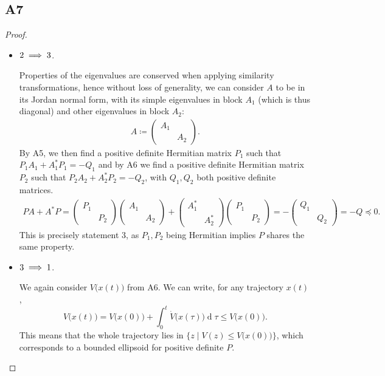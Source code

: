 \documentclass[11pt]{article}
\DeclareMathOperator{\newdiff}{d} %
\newcommand{\dif}{\newdiff\!}
\begin{document}
\subsection*{A7}
\begin{proof}\leavevmode
\begin{itemize}
	\item \(\textnormal{2} \implies \textnormal{3}\).
	
	Properties of the eigenvalues are conserved when applying similarity transformations, hence without loss of generality, we can consider \(A\) to be in its Jordan normal form, with its simple eigenvalues in block $A_1$ (which is thus diagonal) and other eigenvalues in block $A_2$:
	\begin{align*}
	A \coloneqq \begin{pmatrix}
	A_1 & \\
	& A_2
	\end{pmatrix}.
	\end{align*}
	By A5, we then find a positive definite  Hermitian matrix $P_1$ such that $P_1A_1+A_1^*P_1=-Q_1$ and by A6 we find a positive definite Hermitian matrix $P_2$ such that $P_2A_2+A_2^*P_2=-Q_2$, with \(Q_1, Q_2\) both positive definite matrices.
	\begin{align*}
	P A + A^* P = 
	\begin{pmatrix}
	P_1 & \\
	& P_2
	\end{pmatrix}
	\begin{pmatrix}
	A_1 & \\
	& A_2
	\end{pmatrix}
	+
	\begin{pmatrix}
	A_1^* & \\
	& A_2^*
	\end{pmatrix}
	\begin{pmatrix}
	P_1 & \\
	& P_2
	\end{pmatrix}=-
	\begin{pmatrix}
	Q_1 & \\
	& Q_2
	\end{pmatrix} = -Q \preceq 0.
	\end{align*}
	This is precisely statement 3, as \(P_1, P_2\) being Hermitian implies \(P\) shares the same property.
	\item \(\textnormal{3} \implies \textnormal{1}\).
	
	We again consider \(V\big(x(t)\big)\) from A6.
	We can write, for any trajectory \(x(t)\),
	\[
	V\big(x(t)\big) = V\big(x(0)\big) + \int_0^{t} \dot{V}\big(x(\tau)\big) \dif \tau \leqslant V\big(x(0)\big).
	\]
	This means that the whole trajectory lies in \(\Big\{z \mid V(z) \leqslant V\big(x(0)\big)\Big\}\), which corresponds to a bounded ellipsoid for positive definite \(P\).\qedhere
\end{itemize}
\end{proof}
\end{document}
